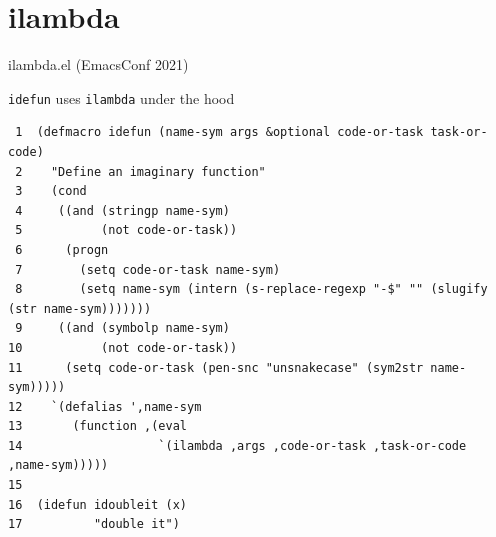 \documentclass[presentation]{beamer}
\begin{document}
\section{ilambda}
\label{sec:org523fe23}
\begin{frame}[label={sec:orgb54ce8a},fragile]{ilambda.el (EmacsConf 2021)}
 \begin{block}{\texttt{idefun} uses \texttt{ilambda} under the hood}
{\tiny
\begin{verbatim}
 1  (defmacro idefun (name-sym args &optional code-or-task task-or-code)
 2    "Define an imaginary function"
 3    (cond
 4     ((and (stringp name-sym)
 5           (not code-or-task))
 6      (progn
 7        (setq code-or-task name-sym)
 8        (setq name-sym (intern (s-replace-regexp "-$" "" (slugify (str name-sym)))))))
 9     ((and (symbolp name-sym)
10           (not code-or-task))
11      (setq code-or-task (pen-snc "unsnakecase" (sym2str name-sym)))))
12    `(defalias ',name-sym
13       (function ,(eval
14                   `(ilambda ,args ,code-or-task ,task-or-code ,name-sym)))))
15  
16  (idefun idoubleit (x)
17          "double it")
\end{verbatim}
}
\end{block}
\end{frame}
\end{document}
